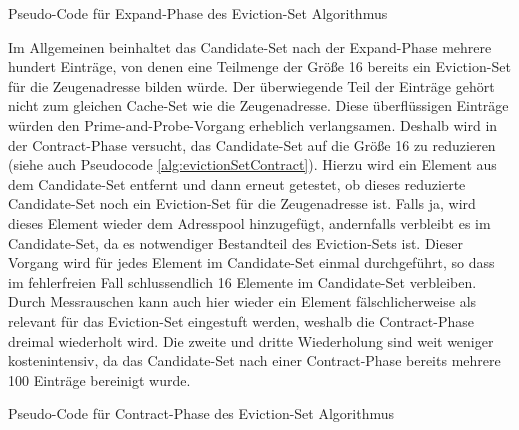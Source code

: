 \begin{algorithm}[h]
\DontPrintSemicolon
\caption{Pseudo-Code für Expand-Phase des Eviction-Set Algorithmus}
\label{alg:evictionSetExpand}

\end{algorithm}

Im Allgemeinen beinhaltet das Candidate-Set nach der Expand-Phase mehrere hundert Einträge, von denen eine Teilmenge der Größe 16 bereits ein Eviction-Set für die Zeugenadresse bilden würde. 
Der überwiegende Teil der Einträge gehört nicht zum gleichen Cache-Set wie die Zeugenadresse.
Diese überflüssigen Einträge würden den Prime-and-Probe-Vorgang erheblich verlangsamen. Deshalb wird in der Contract-Phase versucht, das Candidate-Set auf die Größe 16 zu reduzieren (siehe auch Pseudocode \ref{alg:evictionSetContract}).
Hierzu wird ein Element aus dem Candidate-Set entfernt und dann erneut getestet, ob dieses reduzierte Candidate-Set noch ein Eviction-Set für die Zeugenadresse ist.
Falls ja, wird dieses Element wieder dem Adresspool hinzugefügt, andernfalls verbleibt es im Candidate-Set, da es notwendiger Bestandteil des Eviction-Sets ist.
Dieser Vorgang wird für jedes Element im Candidate-Set einmal durchgeführt, so dass im fehlerfreien Fall schlussendlich 16 Elemente im Candidate-Set verbleiben.
Durch Messrauschen kann auch hier wieder ein Element fälschlicherweise als relevant für das Eviction-Set eingestuft werden, weshalb die Contract-Phase dreimal wiederholt wird.
Die zweite und dritte Wiederholung sind weit weniger kostenintensiv, da das Candidate-Set nach einer Contract-Phase bereits mehrere 100 Einträge bereinigt wurde.

\begin{algorithm}[h]
\DontPrintSemicolon
\caption{Pseudo-Code für Contract-Phase des Eviction-Set Algorithmus}
\label{alg:evictionSetContract}
\end{algorithm}

